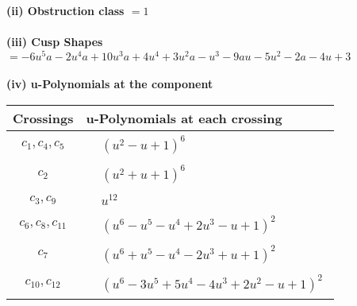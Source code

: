 \documentclass[1p]{elsarticle_modified}
\theoremstyle{definition}
\begin{document}
\flushleft \textbf{(ii) Obstruction class $= 1$}\\~\\
\flushleft \textbf{(iii) Cusp Shapes $= -6 u^5 a-2 u^4 a+10 u^3 a+4 u^4+3 u^2 a- u^3-9 a u-5 u^2-2 a-4 u+3$}\\~\\
\newpage\renewcommand{\arraystretch}{1}
\flushleft \textbf{(iv) u-Polynomials at the component}\newline \\
\begin{tabular}{m{50pt}|m{274pt}}
Crossings & \hspace{64pt}u-Polynomials at each crossing \\
\hline $$\begin{aligned}c_{1},c_{4},c_{5}\end{aligned}$$&$\begin{aligned}
&(u^2- u+1)^6
\end{aligned}$\\
\hline $$\begin{aligned}c_{2}\end{aligned}$$&$\begin{aligned}
&(u^2+u+1)^6
\end{aligned}$\\
\hline $$\begin{aligned}c_{3},c_{9}\end{aligned}$$&$\begin{aligned}
&u^{12}
\end{aligned}$\\
\hline $$\begin{aligned}c_{6},c_{8},c_{11}\end{aligned}$$&$\begin{aligned}
&(u^6- u^5- u^4+2 u^3- u+1)^2
\end{aligned}$\\
\hline $$\begin{aligned}c_{7}\end{aligned}$$&$\begin{aligned}
&(u^6+u^5- u^4-2 u^3+u+1)^2
\end{aligned}$\\
\hline $$\begin{aligned}c_{10},c_{12}\end{aligned}$$&$\begin{aligned}
&(u^6-3 u^5+5 u^4-4 u^3+2 u^2- u+1)^2
\end{aligned}$\\
\hline
\end{tabular}\\~\\
\end{document}
